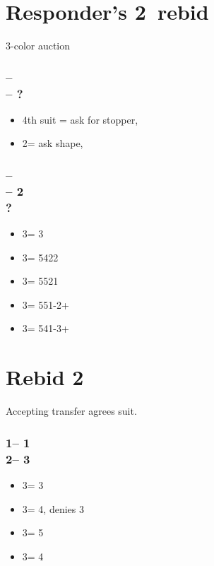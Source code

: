 \section{\texorpdfstring{Responder's 2\ntx\ rebid}{responder2ntRebid}}\label{sec:responder2ntRebid}
3-color auction

\subsubsection*{ --  \\  -- ?}
\begin{itemize}
    \item 4th suit = ask for stopper, \gf
    \item 2\nt = ask shape, \gf
\end{itemize}

\subsubsection*{ --  \\  -- 2\nt \\ ?}
\begin{itemize}
    \item 3\clubs = 3
    \item 3\diams = 5422
    \item 3\hearts = 5521
    \item 3\spades = 551-2+
    \item 3\nt = 541-3+
\end{itemize}

\section{\texorpdfstring{Rebid 2\ntx}{rebid2nt}}\label{sec:rebid2nt}

Accepting transfer agrees suit.

\subsubsection*{1\clubs -- 1\hearts \\ 2\nt -- 3\clubs}
\begin{itemize}
    \item 3\diams = 3\hearts
    \item 3\hearts = 4\spades, denies 3\hearts
    \item 3\spades = 5\clubs
    \item 3\nt = 4\diams
\end{itemize}

